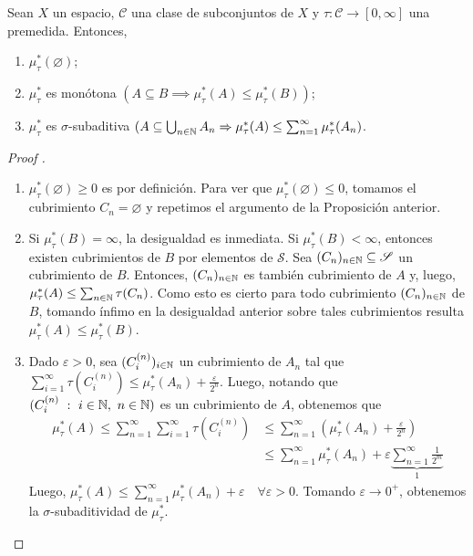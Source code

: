 \begin{theorem}
	Sean $X$ un espacio, $\mathscr{C}$ una clase de subconjuntos de $X$ y $\tau:\mathscr{C} \to [0,\infty]$ una premedida. Entonces,
	\begin{enumerate}
		\item $\mu_{\tau}^{*}(\varnothing)$;

		\item $\mu_{\tau}^{*}$ es monótona $(A \subseteq B \implies \mu_{\tau}^{*}(A)\leq\mu_{\tau}^{*}(B))$;

		\item $\mu_{\tau}^{*}$ es $\sigma$-subaditiva $(A\subseteq\bigcup_{n\in\mathbb{N}}A_n \Rightarrow \mu_{\tau}^{*}(A) \leq \sum_{n=1}^{\infty} \mu_{\tau}^{*}(A_n)$.
	\end{enumerate}
\end{theorem}
\begin{proof}[Proof ]
	\begin{enumerate}
		\item $\mu_{\tau}^{*}(\varnothing)\geq 0$ es por definición. Para ver que $\mu_{\tau}^{*}(\varnothing)\leq 0$, tomamos el cubrimiento $C_n = \varnothing$ y repetimos el argumento de la Proposición anterior.
		
		\item Si $\mu_{\tau}^{*}(B)=\infty$, la desigualdad es inmediata. Si $\mu_{\tau}^{*}(B)<\infty$, entonces existen cubrimientos de $B$ por elementos de $\mathscr{S}$. Sea $(C_n)_{n\in\mathbb{N}}\subseteq\mathscr{S}$ un cubrimiento de $B$. Entonces, $(C_n)_{n\in\mathbb{N}}$ es también cubrimiento de $A$ y, luego, $\mu_{\tau}^{*}(A)\leq \sum_{n\in\mathbb{N}} \tau(C_n)$. Como esto es cierto para todo cubrimiento $(C_n)_{n\in\mathbb{N}}$ de $B$, tomando ínfimo en la desigualdad anterior sobre tales cubrimientos resulta $\mu_{\tau}^{*}(A) \leq \mu_{\tau}^{*}(B)$.

		\item Dado $\varepsilon>0$, sea $(C_{i}^{(n)})_{i\in\mathbb{N}}$ un cubrimiento de $A_n$ tal que $\sum_{i=1}^{\infty} \tau(C_{i}^{(n)}) \leq \mu_{\tau}^{*}(A_n) + \frac{\varepsilon}{2^n}$. Luego, notando que $(C_{i}^{(n)}\ : \ i\in\N,\ n\in\N)$ es un cubrimiento de $A$, obtenemos que
		\begin{align*}
			\mu_{\tau}^{*}(A) \leq \sum_{n=1}^{\infty} \sum_{i=1}^{\infty} \tau(C_{i}^{(n)}) & \leq \sum_{n=1}^{\infty} \left(\mu_{\tau}^{*}(A_n) + \frac{\varepsilon}{2^n} \right) \\
			& \leq \sum_{n=1}^{\infty} \mu_{\tau}^{*}(A_n) + \varepsilon \underbrace{\sum_{n=1}^{\infty} \frac{1}{2^m}}_{1}
		\end{align*}
		Luego, $\mu_{\tau}^{*}(A) \leq \sum_{n=1}^{\infty} \mu_{\tau}^{*}(A_n) + \varepsilon \quad \forall \varepsilon>0$. Tomando $\varepsilon \to 0^+$, obtenemos la $\sigma$-subaditividad de $\mu_{\tau}^{*}$.
	\end{enumerate}
\end{proof}

